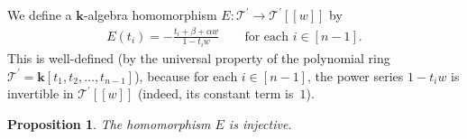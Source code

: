 \documentclass[11pt]{article}
\newtheorem{Proposition}[Theorem]{Proposition}
\numberwithin{equation}{section}
\begin{document}
\begin{Definition} We define a $\mathbf{k}$-algebra homomorphism $E\colon \mathcal{T}^{\prime}\rightarrow\mathcal{T}^{\prime}[[w]] $ by
\begin{gather*}
E(t_{i}) =-\frac{t_{i}+\beta+\alpha w}{1-t_{i}w} \qquad \text{for each }i\in[n-1] .
\end{gather*}
This is well-defined (by the universal property of the polynomial ring $\mathcal{T}^{\prime}=\mathbf{k}[ t_{1},t_{2},\ldots,t_{n-1}] $), because for each $i\in[n-1] $, the power series $1-t_{i}w$ is invertible in $\mathcal{T}^{\prime}[[w]] $ (indeed, its constant term is~$1$).
\end{Definition}

\begin{Proposition}\label{prop.E.inj}The homomorphism $E$ is injective.
\end{Proposition}
\end{document}

